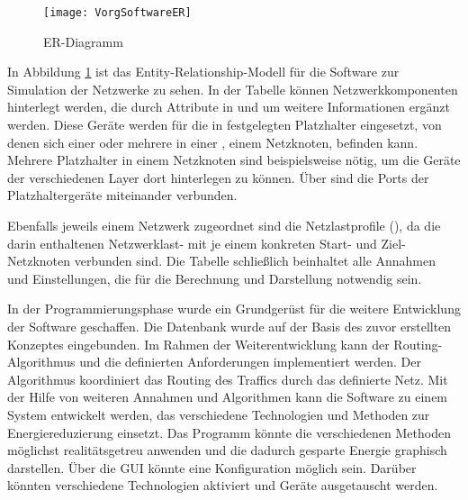 \begin{figure}[!ht]
	\centering
	\texttt{[image: VorgSoftwareER]}
	\caption{ER-Diagramm} %
	\label{fig:VorgSoftwareER}
\end{figure}

In Abbildung \ref{fig:VorgSoftwareER} ist das Entity-Relationship-Modell für die Software zur Simulation der Netzwerke zu sehen. In der Tabelle  können Netzwerkkomponenten hinterlegt werden, die durch Attribute in  und  um weitere Informationen ergänzt werden. Diese Geräte werden für die in  festgelegten Platzhalter eingesetzt, von denen sich einer oder mehrere in einer , einem Netzknoten, befinden kann. Mehrere Platzhalter in einem Netzknoten sind beispielsweise nötig, um die Geräte der verschiedenen Layer dort hinterlegen zu können. Über  sind die Ports der Platzhaltergeräte miteinander verbunden.

Ebenfalls jeweils einem Netzwerk zugeordnet sind die Netzlastprofile (), da die darin enthaltenen Netzwerklast- mit je einem konkreten Start- und Ziel-Netzknoten verbunden sind. Die Tabelle  schließlich beinhaltet alle Annahmen und Einstellungen, die für die Berechnung und Darstellung notwendig sein. 


In der Programmierungsphase wurde ein Grundgerüst für die weitere Entwicklung der Software geschaffen. Die Datenbank wurde auf der Basis des zuvor erstellten Konzeptes eingebunden. Im Rahmen der Weiterentwicklung kann der Routing-Algorithmus und die definierten Anforderungen implementiert werden. Der Algorithmus koordiniert das Routing des Traffics durch das definierte Netz. Mit der Hilfe von weiteren Annahmen und Algorithmen kann die Software zu einem System entwickelt werden, das verschiedene Technologien und Methoden zur Energiereduzierung einsetzt. Das Programm könnte die verschiedenen Methoden möglichst realitätsgetreu anwenden und die dadurch gesparte Energie graphisch darstellen. Über die GUI könnte eine Konfiguration möglich sein.  Darüber könnten verschiedene Technologien aktiviert und Geräte ausgetauscht werden. 


